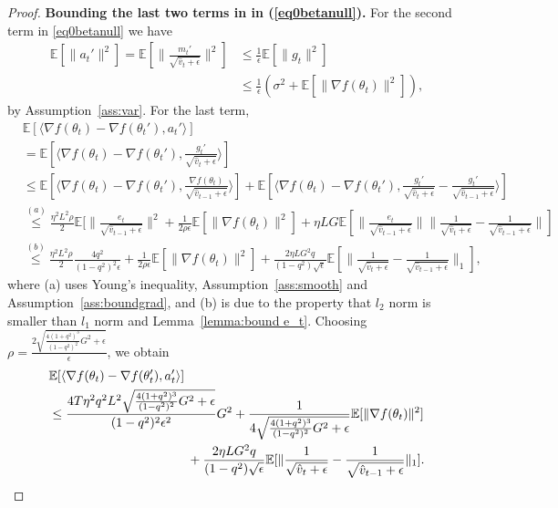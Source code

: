 \documentclass[11pt]{article}
\begin{document}
\begin{proof}
\textbf{Bounding the last two terms in  in (\ref{eq0betanull}).} 
For the second term in \eqref{eq0betanull} we have
\begin{align*}
    \mathbb E[\|a_t'\|^2]=\mathbb E[\|\frac{m_t'}{\sqrt{\hat v_t+\epsilon}}\|^2]&\leq \frac{1}{\epsilon}\mathbb E[\|g_t\|^2]\\
    &\leq \frac{1}{\epsilon}(\sigma^2+\mathbb E[\|\nabla f(\theta_t)\|^2]),
\end{align*}
by Assumption~\ref{ass:var}. For the last term, 
\begin{align}
    &\mathbb E[\langle \nabla f(\theta_t)-\nabla f(\theta_t'),a_t'\rangle]\\
    &=\mathbb E[\langle \nabla f(\theta_t)-\nabla f(\theta_t'),\frac{g_t'}{\sqrt{\hat v_t+\epsilon}}\rangle]\\
    &\leq \mathbb E[\langle \nabla f(\theta_t)-\nabla f(\theta_t'),\frac{\nabla f(\theta_t)}{\sqrt{\hat v_{t-1}+\epsilon}}\rangle] + \mathbb E[\langle \nabla f(\theta_t)-\nabla f(\theta_t'), \frac{g_t'}{\sqrt{\hat v_t+\epsilon}}-\frac{g_t'}{\sqrt{\hat v_{t-1}+\epsilon}}\rangle]\\
    &\overset{(a)}{\leq} \frac{\eta^2 L^2\rho}{2}\mathbb E[\| \frac{e_t}{\sqrt{\hat v_{t-1}+\epsilon}}\|^2+\frac{1}{2\rho \epsilon}\mathbb E[\|\nabla f(\theta_t)\|^2]+\eta LG \mathbb E[\| \frac{e_t}{\sqrt{\hat v_{t-1}+\epsilon}}\| \|\frac{1}{\sqrt{\hat v_t+\epsilon}}-\frac{1}{\sqrt{\hat v_{t-1}+\epsilon}}\|]\\
    &\overset{(b)}{\leq} \frac{\eta^2 L^2\rho}{2} \frac{4q^2}{(1-q^2)^2\epsilon}+\frac{1}{2\rho \epsilon}\mathbb E[\|\nabla f(\theta_t)\|^2]+\frac{2\eta LG^2q}{(1-q^2)\sqrt \epsilon} \mathbb E[\|\frac{1}{\sqrt{\hat v_t+\epsilon}}-\frac{1}{\sqrt{\hat v_{t-1}+\epsilon}}\|_1],
\end{align}
where (a) uses Young's inequality, Assumption~\ref{ass:smooth} and Assumption~\ref{ass:boundgrad}, and (b) is due to the property that $l_2$ norm is smaller than $l_1$ norm and Lemma~\ref{lemma:bound e_t}. Choosing $\rho=\frac{2\sqrt{\frac{4(1+q^2)^3}{(1-q^2)^2}G^2+\epsilon}}{\epsilon}$, we obtain
\begin{align*}
    &\mathbb E[\langle \nabla f(\theta_t)-\nabla f(\theta_t'),a_t'\rangle]\\
    &\leq \frac{4T\eta^2 q^2 L^2\sqrt{\frac{4(1+q^2)^3}{(1-q^2)^2}G^2+\epsilon}}{(1-q^2)^2\epsilon^2}G^2+\frac{1}{4\sqrt{\frac{4(1+q^2)^3}{(1-q^2)^2}G^2+\epsilon}}\mathbb E[\|\nabla f(\theta_t)\|^2]\\
    &\hspace{1.5in} +\frac{2\eta LG^2q}{(1-q^2)\sqrt \epsilon} \mathbb E[\|\frac{1}{\sqrt{\hat v_t+\epsilon}}-\frac{1}{\sqrt{\hat v_{t-1}+\epsilon}}\|_1].

\end{align*}
\end{proof}
\end{document}
